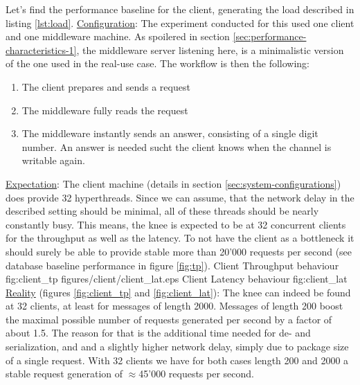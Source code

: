 \documentclass[11pt]{article}
\begin{document}
Let's find the performance baseline for the client, generating the load described in listing \ref{lst:load}.
\newline\underline{Configuration}: The experiment conducted for this used one client and one middleware machine. As spoilered in section \ref{sec:performance-characteristics-1}, the middleware server listening here, is a minimalistic version of the one used in the real-use case. The workflow is then the following:
\begin{enumerate}
	\item The client prepares and sends a request
	\item The middleware fully reads the request
	\item The middleware instantly sends an answer, consisting of a single digit number. An answer is needed sucht the client knows when the channel is writable again.
\end{enumerate}
\underline{Expectation}: The client machine (details in section \ref{sec:system-configurations}) does provide 32 hyperthreads. Since we can assume, that the network delay in the described setting should be minimal, all of these threads should be nearly constantly busy. This means, the knee is expected to be at 32 concurrent clients for the throughput as well as the latency. To not have the client as a bottleneck it should surely be able to provide stable more than 20'000 requests per second (see database baseline performance in figure \ref{fig:tp}).
 {Client Throughput behaviour} {fig:client_tp}
{figures/client/client_lat.eps} {Client Latency behaviour} {fig:client_lat}
\newline\underline{Reality} (figures \ref{fig:client_tp} and \ref{fig:client_lat}): The knee can indeed be found at 32 clients, at least for messages of length 2000. Messages of length 200 boost the maximal possible number of requests generated per second by a factor of about 1.5. The reason for that is the additional time needed for de- and serialization, and and a slightly higher network delay, simply due to package size of a single request. With 32 clients we have for both cases length 200 and 2000 a stable request generation of $\approx$45'000 requests per second.
\end{document}
